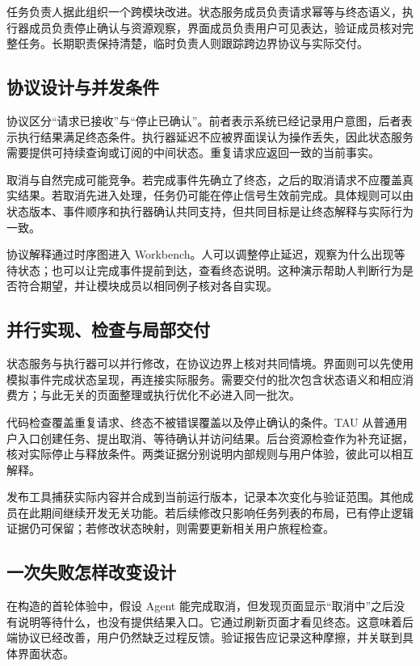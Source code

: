 任务负责人据此组织一个跨模块改进。状态服务成员负责请求幂等与终态语义，执行器成员负责停止确认与资源观察，界面成员负责用户可见表达，验证成员核对完整任务。长期职责保持清楚，临时负责人则跟踪跨边界协议与实际交付。

\subsection{协议设计与并发条件}
协议区分“请求已接收”与“停止已确认”。前者表示系统已经记录用户意图，后者表示执行结果满足终态条件。执行器延迟不应被界面误认为操作丢失，因此状态服务需要提供可持续查询或订阅的中间状态。重复请求应返回一致的当前事实。

取消与自然完成可能竞争。若完成事件先确立了终态，之后的取消请求不应覆盖真实结果。若取消先进入处理，任务仍可能在停止信号生效前完成。具体规则可以由状态版本、事件顺序和执行器确认共同支持，但共同目标是让终态解释与实际行为一致。


协议解释通过时序图进入 Workbench。人可以调整停止延迟，观察为什么出现等待状态；也可以让完成事件提前到达，查看终态说明。这种演示帮助人判断行为是否符合期望，并让模块成员以相同例子核对各自实现。

\subsection{并行实现、检查与局部交付}
状态服务与执行器可以并行修改，在协议边界上核对共同情境。界面则可以先使用模拟事件完成状态呈现，再连接实际服务。需要交付的批次包含状态语义和相应消费方；与此无关的页面整理或执行优化不必进入同一批次。

代码检查覆盖重复请求、终态不被错误覆盖以及停止确认的条件。TAU 从普通用户入口创建任务、提出取消、等待确认并访问结果。后台资源检查作为补充证据，核对实际停止与释放条件。两类证据分别说明内部规则与用户体验，彼此可以相互解释。

发布工具捕获实际内容并合成到当前运行版本，记录本次变化与验证范围。其他成员在此期间继续开发无关功能。若后续修改只影响任务列表的布局，已有停止逻辑证据仍可保留；若修改状态映射，则需要更新相关用户旅程检查。

\subsection{一次失败怎样改变设计}
在构造的首轮体验中，假设 Agent 能完成取消，但发现页面显示“取消中”之后没有说明等待什么，也没有提供结果入口。它通过刷新页面才看见终态。这意味着后端协议已经改善，用户仍然缺乏过程反馈。验证报告应记录这种摩擦，并关联到具体界面状态。

